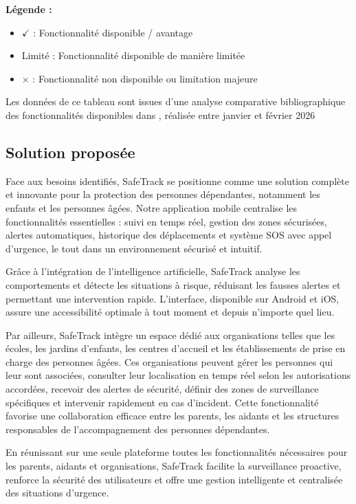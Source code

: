 \noindent \textbf{Légende :}
\begin{itemize}
    \item \colorbox{green!20}{$\checkmark$} : Fonctionnalité disponible / avantage
    \item \colorbox{yellow!20}{Limité} : Fonctionnalité disponible de manière limitée
    \item \colorbox{red!20}{$\times$} : Fonctionnalité non disponible ou limitation majeure
\end{itemize}

Les données de ce tableau sont issues d'une analyse comparative bibliographique des fonctionnalités disponibles dans \cite{findmykids,life360,minifinder,mobiletracker,famisafe}, réalisée entre janvier et février 2026


\subsection{Solution proposée}
Face aux besoins identifiés, SafeTrack se positionne comme une solution complète et innovante pour la protection des personnes dépendantes, notamment les enfants et les personnes âgées. Notre application mobile centralise les fonctionnalités essentielles : suivi en temps réel, gestion des zones sécurisées, alertes automatiques, historique des déplacements et système SOS avec appel d'urgence, le tout dans un environnement sécurisé et intuitif.

Grâce à l'intégration de l'intelligence artificielle, SafeTrack analyse les comportements et détecte les situations à risque, réduisant les fausses alertes et permettant une intervention rapide. L'interface, disponible sur Android et iOS, assure une accessibilité optimale à tout moment et depuis n'importe quel lieu.

Par ailleurs, SafeTrack intègre un espace dédié aux organisations telles que les écoles, les jardins d'enfants, les centres d'accueil et les établissements de prise en charge des personnes âgées. Ces organisations peuvent gérer les personnes qui leur sont associées, consulter leur localisation en temps réel selon les autorisations accordées, recevoir des alertes de sécurité, définir des zones de surveillance spécifiques et intervenir rapidement en cas d'incident. Cette fonctionnalité favorise une collaboration efficace entre les parents, les aidants et les structures responsables de l'accompagnement des personnes dépendantes.

En réunissant sur une seule plateforme toutes les fonctionnalités nécessaires pour les parents, aidants et organisations, SafeTrack facilite la surveillance proactive, renforce la sécurité des utilisateurs et offre une gestion intelligente et centralisée des situations d'urgence.

